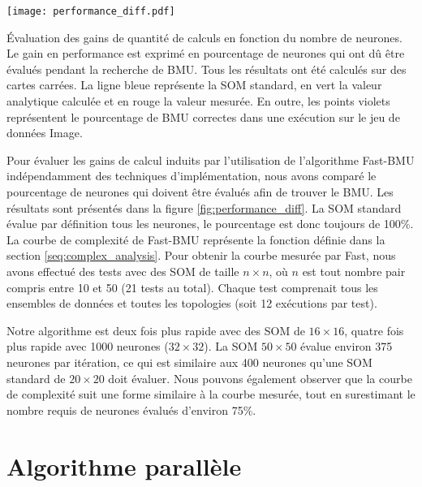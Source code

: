 	\begin{figureth}
    	\centering
    	\texttt{[image: performance\_diff.pdf]}
    	\caption[Évaluation des gains de performance en fonction du nombre de neurones]{Évaluation des gains de quantité de calculs en fonction du nombre de neurones. Le gain en performance est exprimé en pourcentage de neurones qui ont dû être évalués pendant la recherche de BMU. Tous les résultats ont été calculés sur des cartes carrées. La ligne bleue représente la SOM standard, en vert la valeur analytique calculée et en rouge la valeur mesurée. En outre, les points violets représentent le pourcentage de BMU correctes dans une exécution sur le jeu de données Image.}
    	\label{fig:performance_diff}
	\end{figureth}

	Pour évaluer les gains de calcul induits par l'utilisation de l'algorithme Fast-BMU indépendamment des techniques d'implémentation, nous avons comparé le pourcentage de neurones qui doivent être évalués afin de trouver le BMU. Les résultats sont présentés dans la figure \ref{fig:performance_diff}. La SOM standard évalue par définition tous les neurones, le pourcentage est donc toujours de 100\%. La courbe de complexité de Fast-BMU représente la fonction définie dans la section \ref{seq:complex_analysis}. Pour obtenir la courbe mesurée par Fast, nous avons effectué des tests avec des SOM de taille $n\times n$, où $n$ est tout nombre pair compris entre 10 et 50 (21 tests au total). Chaque test comprenait tous les ensembles de données et toutes les topologies (soit 12 exécutions par test).

	Notre algorithme est deux fois plus rapide avec des SOM de $16\times16$, quatre fois plus rapide avec 1000 neurones ($32\times32$). La SOM $50\times50$ évalue environ 375 neurones par itération, ce qui est similaire aux 400 neurones qu'une SOM standard de $20\times20$ doit évaluer. Nous pouvons également observer que la courbe de complexité suit une forme similaire à la courbe mesurée, tout en surestimant le nombre requis de neurones évalués d'environ 75\%.

	\newpage
	\section{Algorithme parallèle}

